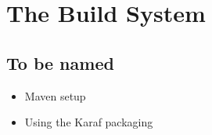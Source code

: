 \part{The Build System}
\chapter{To be named}

\begin{itemize}
 \item Maven setup
 \item Using the Karaf packaging 
\end{itemize}
